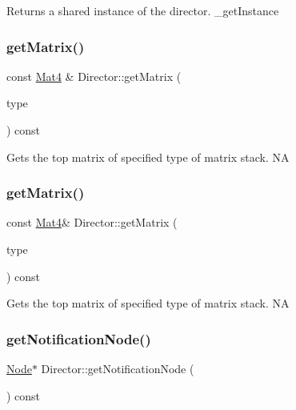 Returns a shared instance of the director.  \+\_\+get\+Instance \mbox{\label{classDirector_a4e361548a1bec142a29b4a5e1148fe60}} 
\subsubsection{\texorpdfstring{get\+Matrix()}{getMatrix()}\hspace{0.1cm}{\footnotesize\ttfamily [1/2]}}
{\footnotesize\ttfamily const \hyperlink{classMat4}{Mat4} \& Director\+::get\+Matrix (\begin{DoxyParamCaption}\item[{\hyperlink{group__base_ga4d146cef7130a8f3a953d46964ea3905}{M\+A\+T\+R\+I\+X\+\_\+\+S\+T\+A\+C\+K\+\_\+\+T\+Y\+PE}}]{type }\end{DoxyParamCaption}) const}

Gets the top matrix of specified type of matrix stack.  NA \mbox{\label{classDirector_affe74971c575a355c5fe98fad47c3398}} 
\subsubsection{\texorpdfstring{get\+Matrix()}{getMatrix()}\hspace{0.1cm}{\footnotesize\ttfamily [2/2]}}
{\footnotesize\ttfamily const \hyperlink{classMat4}{Mat4}\& Director\+::get\+Matrix (\begin{DoxyParamCaption}\item[{\hyperlink{group__base_ga4d146cef7130a8f3a953d46964ea3905}{M\+A\+T\+R\+I\+X\+\_\+\+S\+T\+A\+C\+K\+\_\+\+T\+Y\+PE}}]{type }\end{DoxyParamCaption}) const}

Gets the top matrix of specified type of matrix stack.  NA \mbox{\label{classDirector_a33fe947ebf154c242198d3ad0d95cba4}} 
\subsubsection{\texorpdfstring{get\+Notification\+Node()}{getNotificationNode()}\hspace{0.1cm}{\footnotesize\ttfamily [1/2]}}
{\footnotesize\ttfamily \hyperlink{classNode}{Node}$\ast$ Director\+::get\+Notification\+Node (\begin{DoxyParamCaption}{ }\end{DoxyParamCaption}) const\hspace{0.3cm}{\ttfamily [inline]}}

